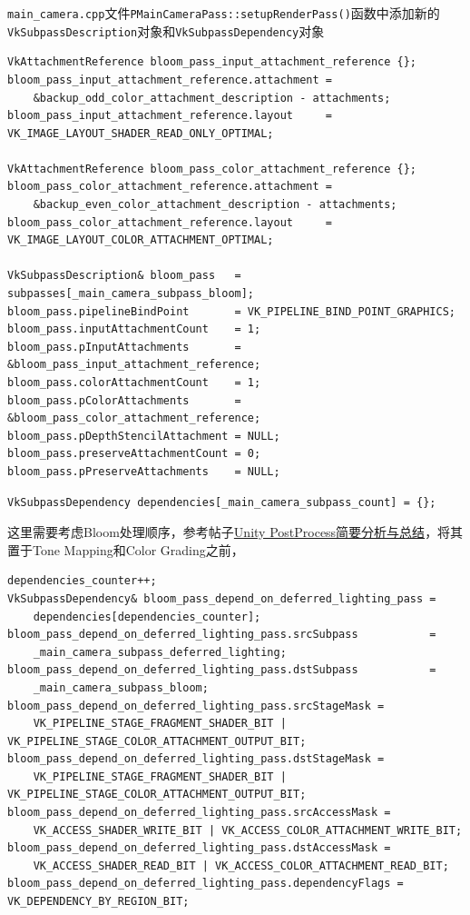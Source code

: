\documentclass{ctexart}
\begin{document}
    \verb|main_camera.cpp|文件\verb|PMainCameraPass::setupRenderPass()|函数中添加新的\verb|VkSubpassDescription|对象和\verb|VkSubpassDependency|对象
    \begin{verbatim}
VkAttachmentReference bloom_pass_input_attachment_reference {};
bloom_pass_input_attachment_reference.attachment = 
    &backup_odd_color_attachment_description - attachments;
bloom_pass_input_attachment_reference.layout     = VK_IMAGE_LAYOUT_SHADER_READ_ONLY_OPTIMAL;

VkAttachmentReference bloom_pass_color_attachment_reference {};
bloom_pass_color_attachment_reference.attachment = 
    &backup_even_color_attachment_description - attachments;
bloom_pass_color_attachment_reference.layout     = VK_IMAGE_LAYOUT_COLOR_ATTACHMENT_OPTIMAL;

VkSubpassDescription& bloom_pass   = subpasses[_main_camera_subpass_bloom];
bloom_pass.pipelineBindPoint       = VK_PIPELINE_BIND_POINT_GRAPHICS;
bloom_pass.inputAttachmentCount    = 1;
bloom_pass.pInputAttachments       = &bloom_pass_input_attachment_reference;
bloom_pass.colorAttachmentCount    = 1;
bloom_pass.pColorAttachments       = &bloom_pass_color_attachment_reference;
bloom_pass.pDepthStencilAttachment = NULL;
bloom_pass.preserveAttachmentCount = 0;
bloom_pass.pPreserveAttachments    = NULL;
    \end{verbatim}
    \begin{verbatim}
VkSubpassDependency dependencies[_main_camera_subpass_count] = {};
    \end{verbatim}
    这里需要考虑Bloom处理顺序，参考帖子\href{https://zhuanlan.zhihu.com/p/118557378}{Unity PostProcess简要分析与总结}，将其置于Tone Mapping和Color Grading之前，
    \begin{verbatim}
dependencies_counter++;
VkSubpassDependency& bloom_pass_depend_on_deferred_lighting_pass = 
    dependencies[dependencies_counter];
bloom_pass_depend_on_deferred_lighting_pass.srcSubpass           = 
    _main_camera_subpass_deferred_lighting;
bloom_pass_depend_on_deferred_lighting_pass.dstSubpass           = 
    _main_camera_subpass_bloom;
bloom_pass_depend_on_deferred_lighting_pass.srcStageMask = 
    VK_PIPELINE_STAGE_FRAGMENT_SHADER_BIT | VK_PIPELINE_STAGE_COLOR_ATTACHMENT_OUTPUT_BIT;
bloom_pass_depend_on_deferred_lighting_pass.dstStageMask =
    VK_PIPELINE_STAGE_FRAGMENT_SHADER_BIT | VK_PIPELINE_STAGE_COLOR_ATTACHMENT_OUTPUT_BIT;
bloom_pass_depend_on_deferred_lighting_pass.srcAccessMask =
    VK_ACCESS_SHADER_WRITE_BIT | VK_ACCESS_COLOR_ATTACHMENT_WRITE_BIT;
bloom_pass_depend_on_deferred_lighting_pass.dstAccessMask =
    VK_ACCESS_SHADER_READ_BIT | VK_ACCESS_COLOR_ATTACHMENT_READ_BIT;
bloom_pass_depend_on_deferred_lighting_pass.dependencyFlags = VK_DEPENDENCY_BY_REGION_BIT;
    \end{verbatim} 
    
    
\end{document}
